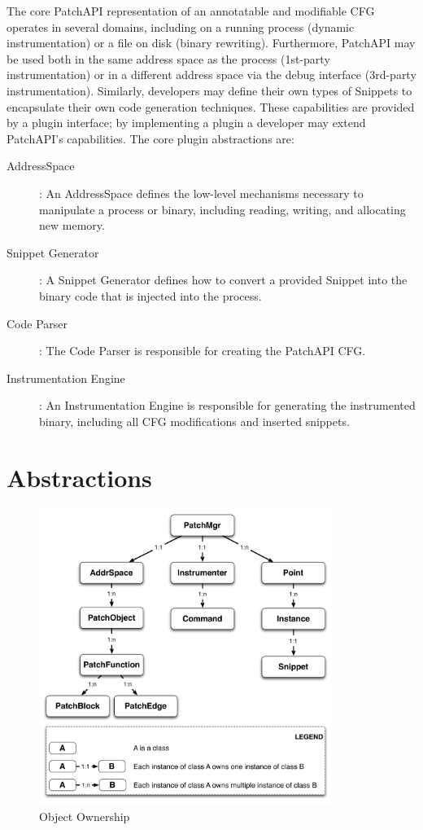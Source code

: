 \documentclass[11pt]{article}
\begin{document}
The core PatchAPI representation of an annotatable and modifiable CFG
operates in several domains, including on a running process (dynamic
instrumentation) or a file on disk (binary rewriting). Furthermore,
PatchAPI may be used both in the same address space as the process
(1st-party instrumentation) or in a different address space via the
debug interface (3rd-party instrumentation). Similarly, developers may
define their own types of Snippets to encapsulate their own code
generation techniques. These capabilities are provided by a plugin
interface; by implementing a plugin a developer may extend PatchAPI's
capabilities. The core plugin abstractions are:

\begin{description}
\item[AddressSpace]: An AddressSpace defines the low-level mechanisms
  necessary to manipulate a process or binary, including reading,
  writing, and allocating new memory.
\item[Snippet Generator]: A Snippet Generator defines how to convert a
  provided Snippet into the binary code that is injected into the
  process.
\item[Code Parser]: The Code Parser is responsible for creating the
  PatchAPI CFG. 
\item[Instrumentation Engine]: An Instrumentation Engine is
  responsible for generating the instrumented binary, including all
  CFG modifications and inserted snippets.
\end{description}



\section{Abstractions}
\label{sec-2}

\begin{figure}[htb]
\centerline{\includegraphics[width=0.85\textwidth]{./figure/abstraction/img.pdf}}
\caption{\label{fig:abs}Object Ownership}
\end{figure}
\end{document}
